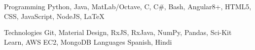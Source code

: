 
\begin{cvskills}
  \cvskill
    {Programming} %
    {Python, Java, MatLab/Octave, C, C\#, Bash, Angular8+, HTML5, CSS, JavaScript, NodeJS, LaTeX} %

  \cvskill
    {Technologies} %
    {Git, Material Design, RxJS, RxJava, NumPy, Pandas, Sci-Kit Learn, AWS EC2, MongoDB} %
  \cvskill
    {Languages}
    {Spanish, Hindi}
\end{cvskills}
